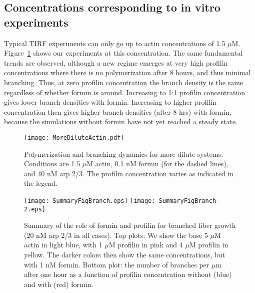 \documentclass[11pt]{article}
\begin{document}
\subsection{Concentrations corresponding to in vitro experiments}
Typical TIRF experiments can only go up to actin concentrations of 1.5 $\mu$M. Figure\ \ref{fig:Actin15} shows our experiments at this concentration. The same fundamental trends are observed, although a new regime emerges at very high profilin concentrations where there is no polymerization after 8 hours, and thus minimal branching. Thus, at zero profilin concentration the branch density is the same regardless of whether formin is around. Increasing to 1:1 profilin concentration gives lower branch densities with formin. Increasing to higher profilin concentration then gives higher branch densities (after 8 hrs) with formin, because the simulations without formin have not yet reached a steady state.

\begin{figure}
\centering
\texttt{[image: MoreDiluteActin.pdf]}
\caption{\label{fig:Actin15} Polymerization and branching dynamics for more dilute systems. Conditions are 1.5 $\mu$M actin, 0.1 nM formin (for the dashed lines), and 40 nM arp 2/3. The profilin concentration varies as indicated in the legend.  }
\end{figure}

\begin{figure}
\centering
\texttt{[image: SummaryFigBranch.eps]}
\texttt{[image: SummaryFigBranch-2.eps]}
\caption{\label{fig:SumPlotBr}Summary of the role of formin and profilin for branched fiber growth (20 nM arp 2/3 in all cases). Top plots: We show the base 5 $\mu$M actin in light blue, with 1 $\mu$M profilin in pink and 4 $\mu$M profilin in yellow. The darker colors then show the same concentrations, but with 1 nM formin. Bottom plot: the number of branches per $\mu$m after one hour as a function of profilin concentration without (blue) and with (red) formin.}
\end{figure}
\end{document}
